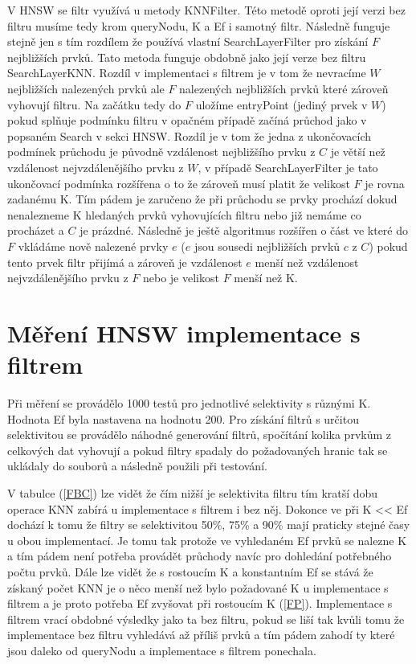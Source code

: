 \documentclass[czech,semestral,dept460,male,csharp,cpdeclaration]{diploma}
\begin{document}
		V HNSW se filtr využívá u metody KNNFilter. Této metodě oproti její verzi bez filtru musíme tedy krom queryNodu, K a Ef i samotný filtr. Následně funguje stejně jen s tím rozdílem že používá vlastní SearchLayerFilter pro získání $F$ nejbližších prvků. Tato metoda funguje obdobně jako její verze bez filtru SearchLayerKNN. Rozdíl v implementaci s filtrem je v tom že nevracíme $W$ nejbližších nalezených prvků ale $F$ nalezených nejbližších prvků které zároveň vyhovují filtru. Na začátku tedy do $F$ uložíme entryPoint (jediný prvek v $W$) pokud splňuje podmínku filtru v opačném případě začíná průchod jako v popsaném Search v sekci HNSW. Rozdíl je v tom že jedna z ukončovacích podmínek průchodu je původně vzdálenost nejbližšího prvku z $C$ je větší než vzdálenost nejvzdálenějšího prvku z $W$, v případě SearchLayerFilter je tato ukončovací podmínka rozšířena o to že zároveň musí platit že velikost $F$ je rovna zadanému K. Tím pádem je zaručeno že při průchodu se prvky prochází dokud nenalezneme K hledaných prvků vyhovujících filtru nebo již nemáme co procházet a $C$ je prázdné. Následně je ještě algoritmus rozšířen o část ve které do $F$ vkládáme nově nalezené prvky $e$ ($e$ jsou sousedi nejbližších prvků $c$ z $C$) pokud tento prvek filtr přijímá a zároveň je vzdálenost $e$ menší než vzdálenost nejvzdálenějšího prvku z $F$ nebo je velikost $F$ menší než K.
		
		\section{Měření HNSW implementace s filtrem}
		
		Při měření se provádělo 1000 testů pro jednotlivé selektivity s různými K. Hodnota Ef byla nastavena na hodnotu 200. Pro získání filtrů s určitou selektivitou se provádělo náhodné generování filtrů, spočítání kolika prvkům z celkových dat vyhovují a pokud filtry spadaly do požadovaných hranic tak se ukládaly do souborů a následně použili při testování.
		
		V tabulce (\ref{FBC}) lze vidět že čím nižší je selektivita filtru tím kratší dobu operace KNN zabírá u implementace s filtrem i bez něj. Dokonce ve při K << Ef dochází k tomu že filtry se selektivitou 50\%, 75\% a 90\% mají praticky stejné časy u obou implementací. Je tomu tak protože ve vyhledaném Ef prvků se nalezne K a tím pádem není potřeba provádět průchody navíc pro dohledání potřebného počtu prvků. Dále lze vidět že s rostoucím K a konstantním Ef se stává že získaný počet KNN je o něco menší než bylo požadované K u implementace s filtrem a je proto potřeba Ef zvyšovat při rostoucím K (\ref{FP}). Implementace s filtrem vrací obdobné výsledky jako ta bez filtru, pokud se liší tak kvůli tomu že implementace bez filtru vyhledává až příliš prvků a tím pádem zahodí ty které jsou daleko od queryNodu a implementace s filtrem ponechala.
		
\end{document}
